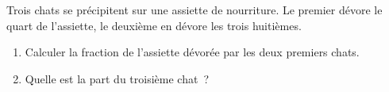 \documentclass[exercice]{thedocument}%
\begin{document}
%
    Trois chats se précipitent sur une assiette de nourriture. Le premier dévore
    le quart de l'assiette, le deuxième en dévore les trois huitièmes.
    \begin{enumerate}
        \item Calculer la fraction de l'assiette dévorée par les deux premiers
        chats.
        \item Quelle est la part du troisième chat~?
    \end{enumerate}
\end{document}
